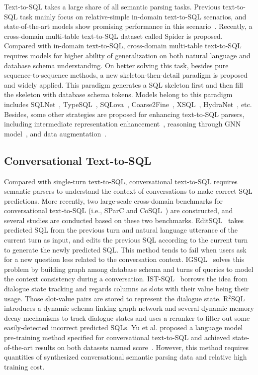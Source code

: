 \documentclass[a4paper]{article}
\begin{document}
Text-to-SQL takes a large share of all semantic parsing tasks. Previous text-to-SQL task mainly focus on relative-simple in-domain text-to-SQL scenarios, and state-of-the-art models show promising performance in this scenario~\cite{zhongSeq2SQL2017,sun2018semantic,guo2019content}.
Recently, a cross-domain multi-table text-to-SQL dataset called Spider is proposed\cite{yu2018spider}. Compared with in-domain text-to-SQL, cross-domain multi-table text-to-SQL requires models for higher ability of generalization on both natural language and database schema understanding. On better solving this task, besides pure sequence-to-sequence methods, a new skeleton-then-detail paradigm is proposed and widely applied. This paradigm generates a SQL skeleton first and then fill the skeleton with database schema tokens. Models belong to this paradigm includes SQLNet~\cite{xu2017sqlnet}, TypeSQL~\cite{yu2018typesql}, SQLova~\cite{hwang2019comprehensive}, Coarse2Fine~\cite{dong2018coarse}, XSQL~\cite{he2019x}, HydraNet~\cite{lyu2020hybrid}, etc. Besides, some other strategies are proposed for enhancing text-to-SQL parsers, including intermediate representation enhancement~\cite{yu2018syntaxsqlnet,guo2019towards,herzig2021unlocking}, reasoning through GNN model~\cite{bogin2019representing,bogin2019global,wang2019rat,cao2021lgesql,chen2021shadowgnn}, and data augmentation~\cite{andreas2019good,wang2021learning}.

\subsection{Conversational Text-to-SQL}
Compared with single-turn text-to-SQL, conversational text-to-SQL requires semantic parsers to understand the context of conversations to make correct SQL predictions. More recently, two large-scale cross-domain benchmarks for conversational text-to-SQL (i.e., SParC and CoSQL~\cite{yu2019sparc,yu2019cosql}) are constructed, and several studies are conducted based on these two benchmarks. EditSQL~\cite{zhang2019editing} takes predicted SQL from the previous turn and natural language utterance of the current turn as input, and edits the previous SQL according to the current turn to generate the newly predicted SQL. This method tends to fail when users ask for a new question less related to the conversation context. IGSQL~\cite{cai2020igsql} solves this problem by building graph among database schema and turns of queries to model the context consistency during a conversation. IST-SQL~\cite{wang2020tracking} borrows the idea from dialogue state tracking and regards columns as slots with their value being their usage. Those slot-value pairs are stored to represent the dialogue state.  R$^2$SQL~\cite{hui2021dynamic} introduces a dynamic schema-linking graph network and several dynamic memory decay mechanisms to track dialogue states and uses a reranker to filter out some easily-detected incorrect predicted SQLs.  Yu et al. proposed a language model pre-training method specified for conversational text-to-SQL and achieved state-of-the-art results on both datasets named score~\cite{yu2020score}. However, this method requires quantities of synthesized conversational semantic parsing data and relative high training cost.
\end{document}
